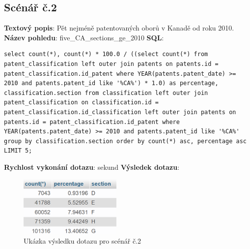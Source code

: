 \subsection{Scénář č.2}
\textbf{Textový popis}: Pět nejméně patentovaných oborů v Kanadě od roku 2010.
\newline
\textbf{Název pohledu}: five\_CA\_sections\_ge\_2010
\newline
\textbf{SQL}: 
\begin{lstlisting}[label = {lst:elements_a}]
select count(*), count(*) * 100.0 / ((select count(*) from patent_classification left outer join patents on patents.id = patent_classification.id_patent where YEAR(patents.patent_date) >= 2010 and patents.patent_id like '%CA%') * 1.0) as percentage, classification.section from classification left outer join patent_classification on classification.id = patent_classification.id_classification left outer join patents on patents.id = patent_classification.id_patent where YEAR(patents.patent_date) >= 2010 and patents.patent_id like '%CA%' group by classification.section order by count(*) asc, percentage asc LIMIT 5;
\end{lstlisting}
\textbf{Rychlost vykonání dotazu}:  sekund
\newline
\textbf{Výsledek dotazu}:
\begin{figure}[H]
\centering
\includegraphics[width=5cm]{img/scenare/scenar_2}
\caption{Ukázka výsledku dotazu pro scénář č.2}
\label{fig:scenar2}
\end{figure}

\newpage
